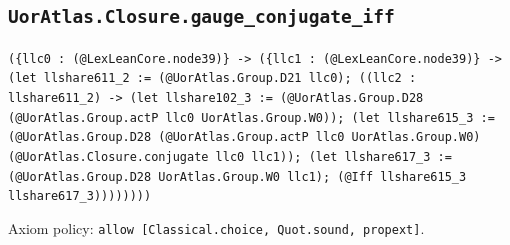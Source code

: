 \documentclass[11pt]{article}
\begin{document}
\subsection*{\texttt{UorAtlas.Closure.gauge\_conjugate\_iff}}
\noindent\texttt{(\{llc0 : (@LexLeanCore.node39)\} -> (\{llc1 : (@LexLeanCore.node39)\} -> (let llshare611\_2 := (@UorAtlas.Group.D21 llc0); ((llc2 : llshare611\_2) -> (let llshare102\_3 := (@UorAtlas.Group.D28 (@UorAtlas.Group.actP llc0 UorAtlas.Group.W0)); (let llshare615\_3 := (@UorAtlas.Group.D28 (@UorAtlas.Group.actP llc0 UorAtlas.Group.W0) (@UorAtlas.Closure.conjugate llc0 llc1)); (let llshare617\_3 := (@UorAtlas.Group.D28 UorAtlas.Group.W0 llc1); (@Iff llshare615\_3 llshare617\_3))))))))}\par
\noindent Axiom policy: \texttt{allow [Classical.choice, Quot.sound, propext]}.\par
\end{document}
